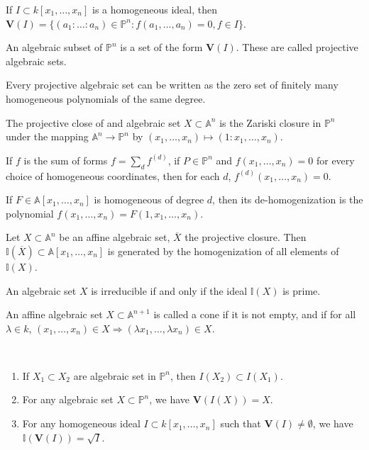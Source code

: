 \documentclass[crop=false,class=book,oneside]{standalone}
\begin{document}
\begin{definition}
If $I\subset k[x_1,\hdots ,x_n]$ is a homogeneous ideal, then $\mathbf{V}(I)=\{(a_1:\hdots:a_{n})\in\mathbb{P}^{n}:f(a_{1},\hdots,a_{n})=0,f\in I\}$.
\end{definition}
\begin{definition}
An algebraic subset of $\mathbb{P}^{n}$ is a set of the form $\mathbf{V}(I)$. These are called projective algebraic sets.
\end{definition}
\begin{theorem}
Every projective algebraic set can be written as the zero set of finitely many homogeneous polynomials of the same degree.
\end{theorem}
\begin{definition}
The projective close of and algebraic set $X\subset \mathbb{A}^n$ is the Zariski closure in $\mathbb{P}^n$ under the mapping $\mathbb{A}^n \rightarrow \mathbb{P}^n$ by $(x_1,\hdots, x_n) \mapsto (1:x_1,\hdots, x_n)$.
\end{definition}
\begin{theorem}
If $f$ is the sum of forms $f = \sum_{d} f^{(d)}$, if $P\in \mathbb{P}^n$ and $f(x_1,\hdots, x_n) = 0$ for every choice of homogeneous coordinates, then for each $d$, $f^{(d)}(x_1,\hdots, x_n) = 0$.
\end{theorem}
\begin{definition}
If $F\in \mathbb{A}[x_1,\hdots, x_n]$ is homogeneous of degree $d$, then its de-homogenization is the polynomial $f(x_1,\hdots, x_n) = F(1,x_1,\hdots, x_n)$.
\end{definition}
\begin{theorem}
Let $X\subset \mathbb{A}^n$ be an affine algebraic set, $\overline{X}$ the projective closure. Then $\mathbb{I}(\overline{X})\subset \mathbb{A}[x_1,\hdots, x_n]$ is generated by the homogenization of all elements of $\mathbb{I}(X)$.
\end{theorem}
\begin{theorem}
An algebraic set $X$ is irreducible if and only if the ideal $\mathbb{I}(X)$ is prime.
\end{theorem}
\begin{definition}
An affine algebraic set $X\subset \mathbb{A}^{n+1}$ is called a cone if it is not empty, and if for all $\lambda \in k$, $(x_1,\hdots, x_n) \in X \Rightarrow (\lambda x_1,\hdots, \lambda x_n)\in X$.
\end{definition}
\begin{theorem}
\
\begin{enumerate}
    \item If $X_1\subset X_2$ are algebraic set in $\mathbb{P}^n$, then $I(X_2)\subset I(X_1)$.
    \item For any algebraic set $X\subset \mathbb{P}^n$, we have $\mathbf{V}(I(X)) = X$.
    \item For any homogeneous ideal $I\subset k[x_1,\hdots ,x_n]$ such that $\mathbf{V}(I)\ne \emptyset$, we have $\mathbb{I}(\mathbf{V}(I)) = \sqrt{I}$.
\end{enumerate}
\end{theorem}
\end{document}
